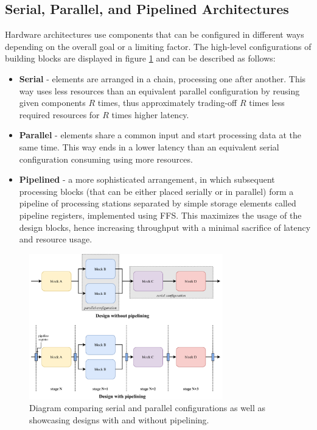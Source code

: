 \subsection{Serial, Parallel, and Pipelined Architectures}\label{serial-parallel-pipelined}
Hardware architectures use components that can be configured in different ways depending on the overall goal or a limiting factor. The high-level configurations of building blocks are displayed in figure \ref{fig:serial-parallel-pipelined} and can be described as follows:

\begin{itemize}
  \item \textbf{Serial} - elements are arranged in a chain, processing one after another. This way uses less resources than an equivalent parallel configuration by reusing given components \(R\) times, thus approximately trading-off \(R\) times less required resources for \(R\) times higher latency.
  \item \textbf{Parallel} - elements share a common input and start processing data at the same time. This way ends in a lower latency than an equivalent serial configuration consuming using more resources.
  \item \textbf{Pipelined} - a more sophisticated arrangement, in which subsequent processing blocks (that can be either placed serially or in parallel) form a pipeline of processing stations separated by simple storage elements called pipeline registers, implemented using FFS. This maximizes the usage of the design blocks, hence increasing throughput with a minimal sacrifice of latency and resource usage.
\end{itemize}

\begin{figure}[hpt!]
  \centering
  \includegraphics[trim={0cm 0cm 0cm 0cm}, width=0.75\textwidth, center]{background/serial_parallel_pipelined.pdf}
  \caption{Diagram comparing serial and parallel configurations as well as showcasing designs with and without pipelining.}
  \label{fig:serial-parallel-pipelined}
\end{figure}

